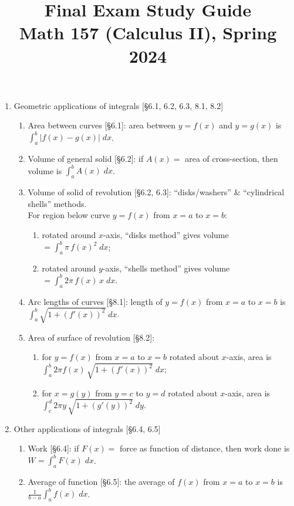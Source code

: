 \documentclass[11pt]{article}
\title{Final Exam Study Guide \\ Math 157 (Calculus II), Spring 2024}
\date{}
\begin{document}
\maketitle

\thispagestyle{empty}

\vspace{-2.4cm}

\begin{enumerate}
\item Geometric applications of integrals [\S6.1, 6.2, 6.3, 8.1, 8.2]
\begin{enumerate}
\item Area between curves [\S6.1]: area between $y=f(x)$ and $y=g(x)$ is $\int_{a}^{b} |f(x)-g(x)| \; dx$.
\item Volume of general solid [\S6.2]: if $A(x)=$ area of cross-section, then volume is $\int_a^b A(x) \;dx$.
\item Volume of solid of revolution [\S6.2, 6.3]: ``disks/washers'' $\&$ ``cylindrical shells'' methods.  \\For region below curve $y=f(x)$ from $x=a$ to $x=b$:
\begin{enumerate}
\item rotated around $x$-axis, ``disks method'' gives volume $=\int_a^b \pi \, f(x)^2 \; dx$;
\item rotated around $y$-axis, ``shells method'' gives volume $=\int_a^b 2 \pi \, f(x) \, x \; dx$.
\end{enumerate}
\item Arc lengths of curves [\S8.1]: length of $y=f(x)$ from $x=a$ to $x=b$ is $\int_{a}^{b} \sqrt{1+(f'(x))^2} \; dx$.
\item Area of surface of revolution [\S8.2]: 
\begin{enumerate}
\item for $y=f(x)$ from $x=a$ to $x=b$ rotated about $x$-axis, area is $\int_{a}^{b} 2\pi f(x) \, \sqrt{1+(f'(x))^2} \; dx$;
\item for $x=g(y)$ from $y=c$ to $y=d$ rotated about $x$-axis, area is $\int_{c}^{d} 2\pi y \, \sqrt{1+(g'(y))^2} \; dy$.
\end{enumerate}
\end{enumerate}

\item Other applications of integrals [\S6.4, 6.5]
\begin{enumerate}
\item Work [\S6.4]: if $F(x)=$ force as function of distance, then work done is $W=\int_{a}^{b} F(x) \; dx$.
\item Average of function [\S6.5]: the average of $f(x)$ from $x=a$ to $x=b$ is $\frac{1}{b-a}\int_a^b f(x) \; dx$.
\end{enumerate}


\end{enumerate}
\end{document}
